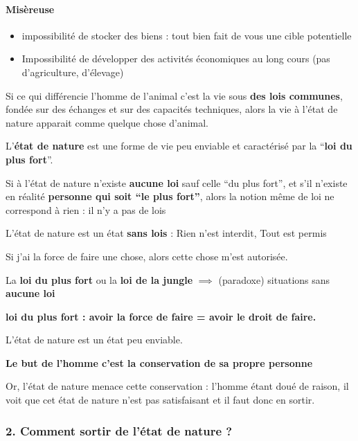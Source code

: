 \documentclass[
]{scrartcl}
\providecommand{\tightlist}{%
  \setlength{\itemsep}{0pt}\setlength{\parskip}{0pt}}
\begin{document}
\hypertarget{misuxe8reuse}{%
\paragraph{Misèreuse}\label{misuxe8reuse}}

\begin{itemize}
\tightlist
\item
  impossibilité de stocker des biens : tout bien fait de vous une cible
  potentielle
\item
  Impossibilité de développer des activités économiques au long cours
  (pas d'agriculture, d'élevage)
\end{itemize}

Si ce qui différencie l'homme de l'animal c'est la vie sous \textbf{des
lois communes}, fondée sur des échanges et sur des capacités techniques,
alors la vie à l'état de nature apparait comme quelque chose d'animal.

L'\textbf{état de nature} est une forme de vie peu enviable et
caractérisé par la ``\textbf{loi du plus fort}''.

Si à l'état de nature n'existe \textbf{aucune loi} sauf celle ``du plus
fort'', et s'il n'existe en réalité \textbf{personne qui soit ``le plus
fort''}, alors la notion même de loi ne correspond à rien : il n'y a pas
de lois

L'état de nature est un état \textbf{sans lois} : Rien n'est interdit,
Tout est permis

Si j'ai la force de faire une chose, alors cette chose m'est autorisée.

La \textbf{loi du plus fort} ou la \textbf{loi de la jungle}
\(\implies\) (paradoxe) situations sans \textbf{aucune loi}

\textbf{loi du plus fort : avoir la force de faire = avoir le droit de
faire.}

L'état de nature est un état peu enviable.

\textbf{Le but de l'homme c'est la conservation de sa propre personne}

Or, l'état de nature menace cette conservation : l'homme étant doué de
raison, il voit que cet état de nature n'est pas satisfaisant et il faut
donc en sortir.

\hypertarget{comment-sortir-de-luxe9tat-de-nature}{%
\subsubsection{2. Comment sortir de l'état de nature
?}\label{comment-sortir-de-luxe9tat-de-nature}}
\end{document}
